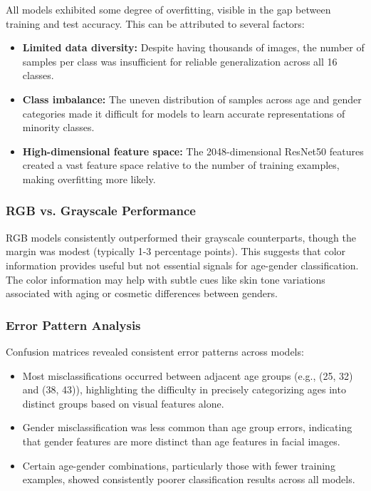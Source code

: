 \documentclass{article}
\begin{document}
All models exhibited some degree of overfitting, visible in the gap between training and test accuracy. This can be attributed to several factors:

\begin{itemize}
    \item \textbf{Limited data diversity:} Despite having thousands of images, the number of samples per class was insufficient for reliable generalization across all 16 classes.
    
    \item \textbf{Class imbalance:} The uneven distribution of samples across age and gender categories made it difficult for models to learn accurate representations of minority classes.
    
    \item \textbf{High-dimensional feature space:} The 2048-dimensional ResNet50 features created a vast feature space relative to the number of training examples, making overfitting more likely.
\end{itemize}

\subsubsection{RGB vs. Grayscale Performance}

RGB models consistently outperformed their grayscale counterparts, though the margin was modest (typically 1-3 percentage points). This suggests that color information provides useful but not essential signals for age-gender classification. The color information may help with subtle cues like skin tone variations associated with aging or cosmetic differences between genders.

\subsubsection{Error Pattern Analysis}

Confusion matrices revealed consistent error patterns across models:

\begin{itemize}
    \item Most misclassifications occurred between adjacent age groups (e.g., (25, 32) and (38, 43)), highlighting the difficulty in precisely categorizing ages into distinct groups based on visual features alone.
    
    \item Gender misclassification was less common than age group errors, indicating that gender features are more distinct than age features in facial images.
    
    \item Certain age-gender combinations, particularly those with fewer training examples, showed consistently poorer classification results across all models.
\end{itemize}
\end{document}

